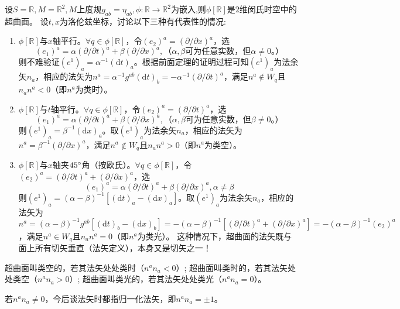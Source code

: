 \begin{example}
	设$S = \mathbb{R}, M = \mathbb{R}^2, M$上度规$g_{ab} = \eta_{ab}, \phi \colon \mathbb{R} \to \mathbb{R}^2$为嵌入,则$\phi[\mathbb{R}]$是$2$维闵氏时空中的超曲面。
	设$t, x$为洛伦兹坐标，讨论以下三种有代表性的情况:
	\begin{enumerate}[（1）]
		\item $\phi[\mathbb{R}]$与$x$轴平行。$\forall q \in \phi[\mathbb{R}]$，令$(e_2)^a = (\partial / \partial x)^a$，选
		$$(e_1)^a = \alpha(\partial / \partial t)^a + \beta(\partial / \partial x)^a, \text{（$\alpha, \beta$可为任意实数，但$\alpha \neq 0$。）}$$
		则不难验证$(e^1)_a = \alpha^{-1}(\mathrm{d}t)_a$。根据前面定理的证明过程可知$(e^1)_a$为法余矢$n_a$，相应的法矢为$n^a = \alpha^{-1}g^{ab}(\mathrm{d}t)_b = -\alpha^{-1}(\partial / \partial t)^a$，满足$n^a \notin W_q$且$n_an^a < 0$（即$n^a$为类时）。
		\item $\phi[\mathbb{R}]$与$t$轴平行。$\forall q \in \phi[\mathbb{R}]$，令$(e_2)^a = (\partial / \partial t)^a$，选
		$$(e_1)^a = \alpha(\partial / \partial t)^a + \beta(\partial / \partial x)^a, \text{（$\alpha, \beta$可为任意实数，但$\beta \neq 0$。）}$$
		则$(e^1)_a = \beta^{-1}(\mathrm{d}x)_a$。取$(e^1)_a$为法余矢$n_a$，相应的法矢为$n^a = \beta^{-1}(\partial / \partial x)^a$，满足$n^a \notin W_q$且$n_an^a > 0$（即$n^a$为类空）。
		\item $\phi[\mathbb{R}]$与$x$轴夹$45\degree$角（按欧氏）。$\forall q \in \phi[\mathbb{R}]$，令$(e_2)^a = (\partial / \partial t)^a + (\partial / \partial x)^a$，选
		$$(e_1)^a = \alpha(\partial / \partial t)^a + \beta(\partial / \partial x)^a, \alpha \neq \beta$$
		则$(e^1)_a = (\alpha - \beta)^{-1}[(\mathrm{d}t)_a - (\mathrm{d}x)_a]$。取$(e^1)_a$为法余矢$n_a$，相应的法矢为$n^a = (\alpha - \beta)^{-1}g^{ab}[(\mathrm{d}t)_b - (\mathrm{d}x)_b] = -(\alpha - \beta)^{-1}[(\partial / \partial t)^a + (\partial / \partial x)^a] = -(\alpha - \beta)^{-1}(e_2)^a$，满足$n^a \in W_q$且$n_an^a = 0$（即$n^a$为类光）。
		这种情况下，超曲面的法矢既与面上所有切矢垂直（法矢定义），本身又是切矢之一！
	\end{enumerate}
\end{example}

\begin{definition}
	超曲面叫类空的，若其法矢处处类时（$n^an_a < 0$）;
	超曲面叫类时的，若其法矢处处类空（$n^an_a > 0$）;
	超曲面叫类光的，若其法矢处处类光（$n^an_a = 0$）。
\end{definition}

若$n^an_a \neq 0$，今后谈法矢时都指归一化法矢，即$n^an_a = \pm 1$。

